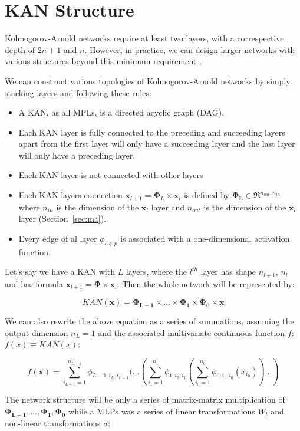 \documentclass[12pt,a4paper]{article}
\begin{document}
\section{KAN Structure}
Kolmogorov-Arnold networks require at least two layers, with a correspective depth of \(2n+1\) and \(n\). However, in practice, we can design larger networks with various structures beyond this minimum requirement \cite{KAN}.

We can construct various topologies of Kolmogorov-Arnold networks by simply stacking layers and following these rules:
\begin{itemize}
    \item A KAN, as all MPLs, is a directed acyclic graph (DAG). 
    \item Each KAN layer is fully connected to the preceding and succeeding layers apart from the first layer will only have a succeeding layer and the last layer will only have a preceding layer.
    \item Each KAN layer is not connected with other layers
    \item Each KAN layers connection $\textbf{x}_{l+1} = \boldsymbol{\Phi}_L \times \textbf{x}_l$ is defined by $\boldsymbol{\Phi_{L}} \in \Re^{n_{out},n_{in}}$ where $n_{in}$ is the dimension of the $\textbf{x}_l$ layer and $n_{out}$ is the dimension of the $\textbf{x}_l$ layer (Section~\ref{sec:ma}).
    \item Every edge of al layer $\phi_{l,q,p}$ is associated with a one-dimensional activation function. 
\end{itemize}

Let’s say we have a KAN with $L$ layers, where the $l^{th}$ layer has shape $n_{l+1}$, $n_l$ and has formula $\textbf{x}_{l+1} = \boldsymbol{\Phi} \times \textbf{x}_l $. Then the whole network will be represented by:

$$KAN(\textbf{x}) = \boldsymbol{\Phi_{L-1}} \times \dots \times \boldsymbol{\Phi_{1}} \times \boldsymbol{\Phi_{0}} \times \textbf{x}$$

We can also rewrite the above equation as a series of summations, assuming the output dimension $n_L = 1$ and the associated multivariate
continuous function $f$:  $f(x) \equiv KAN(x)$:

$$f(\textbf{x}) = \sum_{i_{L-1}=1}^{n_{L-1}}  \phi_{L-1,i_L,i_{L-1}} (...(\sum_{i_1=1}^{n_{1}}  \phi_{1,i_2,i_{1}}(\sum_{i_0=1}^{n_{0}}  \phi_{0,i_1,i_{0}}(x_{i_0}))...)$$

The network structure will be only a series of matrix-matrix multiplication of $ \boldsymbol{\Phi_{L-1}}, \dots, \boldsymbol{\Phi_{1}},\boldsymbol{\Phi_{0}}$  while a MLPs was a series of linear transformations $W_l$ and non-linear transformations $\sigma$:
\end{document}
